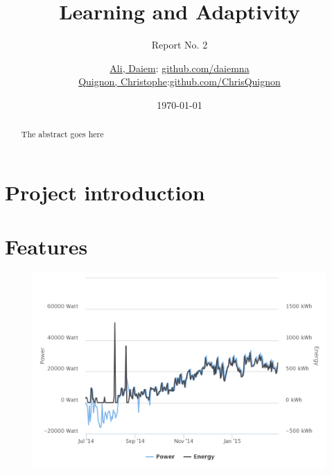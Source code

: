 \documentclass{scrartcl}
\begin{document}
\title{Learning and Adaptivity}
\subtitle{Report No. 2}
\author{
  \href{daiem.ali@smail.inf.h-brs.de}{Ali, Daiem}: \href{https://github.com/daiemna}{github.com/daiemna}\\
  \href{christophe.quignon@smail.inf.h-brs.de}{Quignon, Christophe}:\href{https://github.com/ChrisQuignon}{github.com/ChrisQuignon}
}
\date{\today}


\maketitle



\begin{abstract}
The abstract goes here
\end{abstract}


\section{Project introduction}


\section{Features}


\begin{figure}[H]
  \centering
  \includegraphics[width=0.8\linewidth]{img/powerenergy.png}
  \caption{}
\end{figure}
\end{document}
